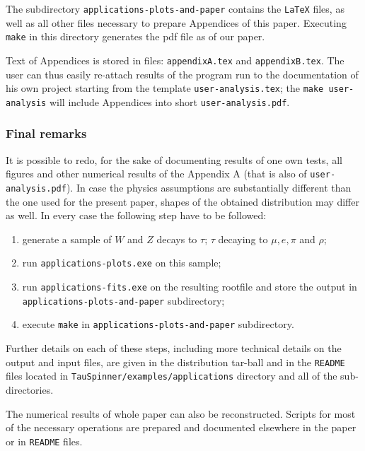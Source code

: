 \documentclass{article}
\begin{document}
The subdirectory {\tt applications-plots-and-paper} contains the {\tt LaTeX} files, as well as all other
files necessary to prepare Appendices of this paper. Executing {\tt make} in this directory generates the pdf file as of our paper.

Text of  Appendices is stored in  files: {\tt appendixA.tex} and {\tt appendixB.tex}.
The user can thus easily re-attach results of the program run to the documentation of his own project starting from the
template {\tt user-analysis.tex};
the {\tt make user-analysis} will include
 Appendices  into short {\tt user-analysis.pdf}. 

\subsubsection{Final remarks}
It is possible to  redo, for the sake of documenting results of one 
own  tests, 
 all figures and other numerical results of the Appendix A 
(that is also of {\tt user-analysis.pdf}).
In case the physics assumptions are substantially different than
the one used for  the present paper, shapes of the obtained distribution
may differ as well.  
In every case 
 the following step have to be followed:

\begin{enumerate}
\item generate a sample of $W$ and $Z$ decays to $\tau$; $\tau$ decaying to $\mu, e, \pi$ and $\rho$;
\item run {\tt applications-plots.exe} on this sample;
\item run {\tt applications-fits.exe} on the resulting rootfile and store the output in {\tt applications-plots-and-paper}
      subdirectory;
\item execute {\tt make} in {\tt applications-plots-and-paper} subdirectory.
\end{enumerate}

Further details on each of these steps, including more technical details on the output and input files, are given
in the distribution tar-ball and in the {\tt README} files located in {\tt TauSpinner/examples/applications}
directory and all of the sub-directories. 

The numerical results of whole paper can also be reconstructed. Scripts 
for most of the necessary operations are prepared and documented elsewhere 
in the paper or in {\tt README} files. 
\end{document}
